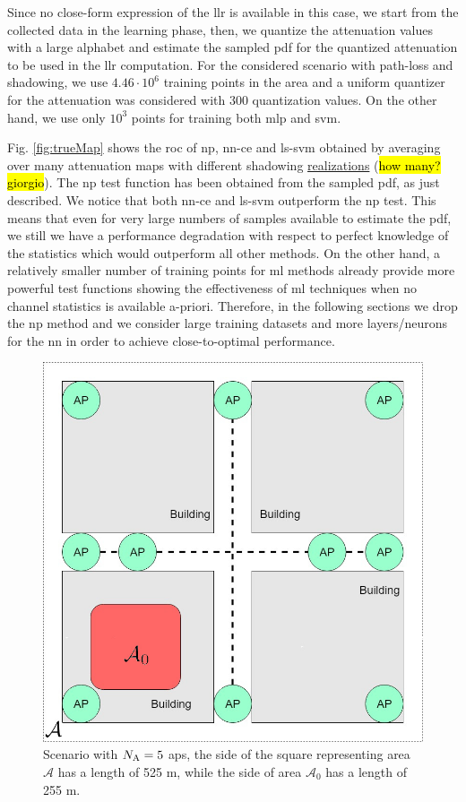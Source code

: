 \documentclass[draftcls,onecolumn,12pt]{IEEEtran}
\begin{document}
Since no close-form expression of the \ac{llr} is available in this case, we start from the collected data in the learning phase, then, we quantize the attenuation values with a large alphabet and estimate the sampled \ac{pdf} for the quantized attenuation to be used in the \ac{llr} computation. For the considered scenario with path-loss and shadowing, we use $4.46 \cdot 10^6$ training points in the area and a uniform quantizer for the attenuation was considered with $300$ quantization values. On the other hand, we use only $10^3$ points for training both \ac{mlp} and \ac{svm}. 

Fig. \ref{fig:trueMap} shows the \ac{roc}  of \ac{np}, \ac{nn}-\ac{ce} and \ac{ls}-\ac{svm} obtained by averaging over many attenuation maps with different shadowing \underline{realizations} (\hl{how many? giorgio}). The \ac{np} test function has been obtained from the sampled \ac{pdf}, as just described. We notice that both \ac{nn}-\ac{ce} and \ac{ls}-\ac{svm} outperform the \ac{np} test. This means that even for very large numbers of samples available to estimate the \ac{pdf}, we still we have a performance degradation with respect to perfect knowledge of the statistics which would outperform all other methods. On the other hand, a relatively smaller number of training points for \ac{ml} methods already provide more powerful test functions showing the effectiveness of \ac{ml} techniques when no channel statistics is available a-priori. Therefore, in the following sections we drop the \ac{np} method and we consider large training datasets and more layers/neurons for the \ac{nn} in order to achieve close-to-optimal performance.
 


\begin{figure}[t]
    \centering
    \includegraphics[width=0.5\columnwidth]{scenarioBuilding.jpg}
    \caption{Scenario with $N_{\rm A} =5$ \acp{ap}, the side of the square representing area $\mathcal A$ has a length of 525 m, while the side of area $\mathcal A_0$ has a length of 255 m.} 
    \label{fig:mBS}
\end{figure}
\end{document}
